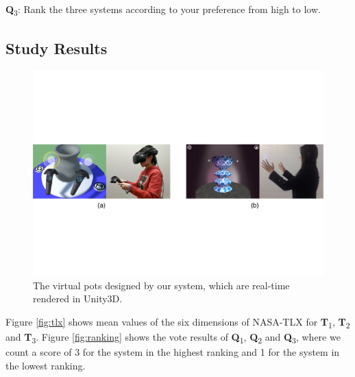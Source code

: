 \documentclass{svjour3}                     %
\begin{document}
\textbf{Q}\textsubscript{3}: Rank the three systems according to your preference from high to low.


\subsection{Study Results}
\label{sec:6.4}

\begin{figure}
\includegraphics[width=\textwidth]{fig13}
\caption{The virtual pots designed by our system, which are real-time rendered in Unity3D.}
\label{fig:pots}
\end{figure}

Figure \ref{fig:tlx} shows mean values of the six dimensions of NASA-TLX for \textbf{T}\textsubscript{1}, \textbf{T}\textsubscript{2} and \textbf{T}\textsubscript{3}.
Figure \ref{fig:ranking} shows the vote results of \textbf{Q}\textsubscript{1}, \textbf{Q}\textsubscript{2} and \textbf{Q}\textsubscript{3}, where we count a score of 3 for the system in the highest ranking and 1 for the system in the lowest ranking. 
\end{document}
